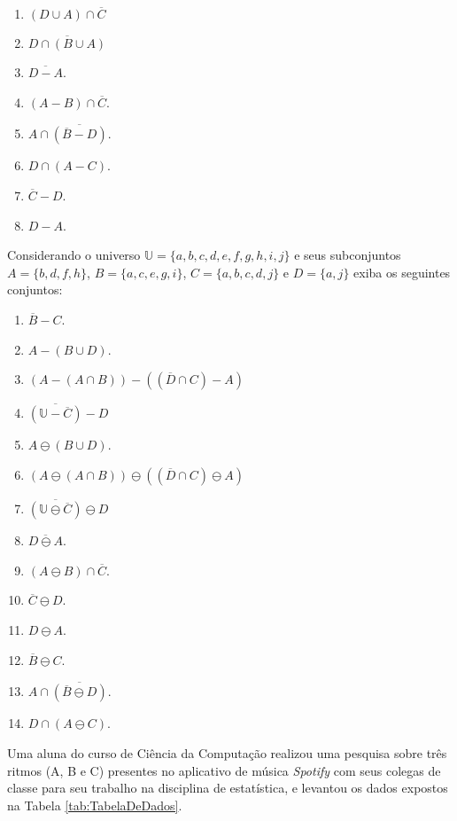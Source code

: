 \begin{problemset}
\begin{enumerate}
		\item $(D \cup A) \cap \overline{C}$
		\item $\overline{D \cap (B \cup A)}$
		\item $\overline{D - A}$.
		\item $(A - B) \cap \overline{C}$.
		\item $A \cap \overline{(\overline{B} - D)}$.
		\item $D \cap (A - C)$.
		\item $\overline{C} - D$.
		\item $D - A$.
	\end{enumerate}
	\item Considerando o universo $\mathbb{U} = \{a, b, c, d, e, f, g, h, i, j\}$ e seus subconjuntos $A = \{b, d, f, h\}$, $B = \{a, c, e, g, i\}$, $C = \{a, b, c, d, j\}$ e $D = \{a, j\}$ exiba os seguintes conjuntos:
	\begin{enumerate}
		\item $\overline{B} - C$.
		\item $A - (B \cup D)$.
		\item $(A - (A \cap B)) - ((\overline{D} \cap C) - A)$
		\item $\overline{(\mathbb{U} - \overline{C})} - D$
		\item $A \ominus (B \cup D)$.
		\item $(A \ominus (A \cap B)) \ominus ((\overline{D} \cap C) \ominus A)$
		\item $\overline{(\mathbb{U} \ominus \overline{C})} \ominus D$
		\item $\overline{D \ominus A}$.
		\item $(A \ominus B) \cap \overline{C}$.
		\item $\overline{C} \ominus D$.
		\item $D \ominus A$.
		\item $\overline{B} \ominus C$.
		\item $A \cap \overline{(\overline{B} \ominus D)}$.
		\item $D \cap (A \ominus C)$.
	\end{enumerate}
	\item Uma aluna do curso de Ciência da Computação realizou uma pesquisa sobre três ritmos (A, B e C) presentes no aplicativo de música \textit{Spotify} com seus colegas de classe para seu trabalho na disciplina de estatística,  e levantou os dados expostos na Tabela \ref{tab:TabelaDeDados}.
	

\end{problemset}
